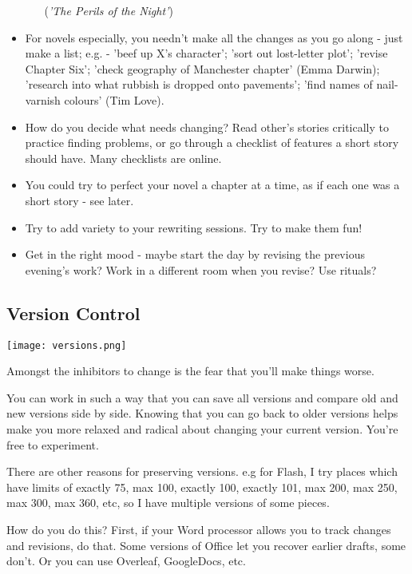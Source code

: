 \documentclass[11pt]{article}
\begin{document}
\begin{itemize}
\begin{itemize}
    (\textit{'The Perils of the Night'})

\end{itemize}

\item  For novels especially, you needn't make all the changes as you go along - just make a list; e.g.  - 'beef up X's character'; 'sort out lost-letter plot'; 'revise Chapter Six'; 'check geography of Manchester chapter' (Emma Darwin); 'research into what rubbish is dropped onto pavements'; 'find names of nail-varnish colours' (Tim Love). 

\item How do you decide what needs changing?  Read other's stories critically to practice finding problems, or go through a checklist of features a short story should have. Many checklists are online.

\item You could try to perfect your novel a chapter at a time, as if each one was a short story - see later.

\item Try to add variety to your rewriting sessions. Try to make them fun!

\item Get in the right mood - maybe start the day by revising the previous evening's work? Work in a different room when you revise? Use rituals?
\end{itemize}

\subsection*{Version Control}

\texttt{[image: versions.png]}

Amongst the inhibitors to change is the fear that you'll make things worse.  

You can work in such a way that you can save all versions and compare old and new versions side by side. Knowing that you can go back to older versions helps make you more relaxed and radical about changing your current version. You're free to experiment.

There are other reasons for preserving versions. e.g for Flash, I try places which have limits of exactly 75, max 100,  exactly 100, exactly 101, max 200, max 250, max 300, max 360, etc, so I have multiple versions of some pieces.

How do you do this? First, if your Word processor allows you to track changes and revisions, do that. Some versions of Office let you recover earlier drafts, some don't. Or you can use Overleaf, GoogleDocs, etc.
\end{document}
